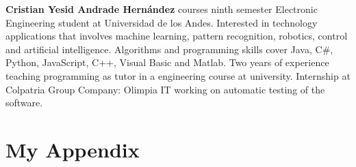\documentclass[a4paper,fleqn]{cas-dc}
\begin{document}
\printcredits

%





\textbf{Cristian Yesid Andrade Hernández} courses ninth semester Electronic Engineering student at Universidad de los Andes. Interested in technology applications that involves machine learning, pattern recognition, robotics, control and artificial intelligence. Algorithms and programming skills cover Java, C\#, Python, JavaScript, C++, Visual Basic and Matlab. Two years of experience teaching programming as tutor in a engineering course at university. Internship at Colpatria Group Company: Olimpia IT working on automatic testing of the software.
\endbio

\onecolumn
\appendix
\section{My Appendix}
\end{document}
